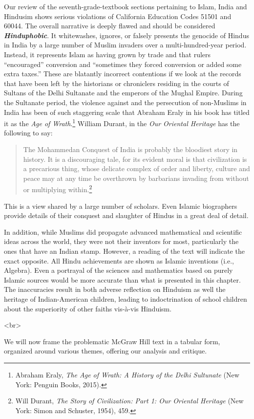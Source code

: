 Our review of the seventh-grade-textbook sections pertaining to Islam, India and Hindusim shows serious violations of California Education Codes 51501 and 60044. The overall narrative is deeply flawed and should be considered \textit{\textbf{Hinduphobic}}. It whitewashes, ignores, or falsely presents the genocide of Hindus in India by a large number of Muslim invaders over a multi-hundred-year period. Instead, it represents Islam as having grown by trade and that rulers “encouraged” conversion and “sometimes they forced conversion or added some extra taxes.” These are blatantly incorrect contentions if we look at the records that have been left by the historians or chroniclers residing in the courts of Sultans of the Delhi Sultanate and the emperors of the Mughal Empire. During the Sultanate period, the violence against and the persecution of non-Muslims in India has been of such staggering scale that Abraham Eraly in his book has titled it as the \textit{Age of Wrath}.\footnote{Abraham Eraly, \textit{The Age of Wrath: A History of the Delhi Sultunate} (New York: Penguin Books, 2015).} William Durant, in the \textit{Our Oriental Heritage}  has the following to say:
\begin{quote}
The Mohammedan Conquest of India is probably the bloodiest story in history. It is a discouraging tale, for its evident moral is that civilization is a precarious thing, whose delicate complex of order and liberty, culture and peace may at any time be overthrown by barbarians invading from without or multiplying within.\footnote{Will Durant, \textit{The Story of Civilization: Part 1: Our Oriental Heritage} (New York: Simon and Schuster, 1954), 459.}  
\end{quote}
This is a view shared by a large number of scholars. Even Islamic biographers provide details of their conquest and slaughter of Hindus in a great deal of detail.  

In addition, while Muslims did propagate advanced mathematical and scientific ideas across the world, they were not their inventors for most, particularly the ones that have an Indian stamp. However, a reading of the text will indicate the exact opposite. All Hindu achievements are shown as Islamic inventions (i.e., Algebra). Even a portrayal of the sciences and mathematics based on purely Islamic sources would be more accurate than what is presented in this chapter. The inaccuracies result in both adverse reflection on Hinduism as well the heritage of Indian-American children, leading to indoctrination of school children about the superiority of other faiths vis-à-vis Hinduism.

<br> 

We will now frame the problematic McGraw Hill text in a tabular form, organized around various themes, offering our analysis and critique.  
